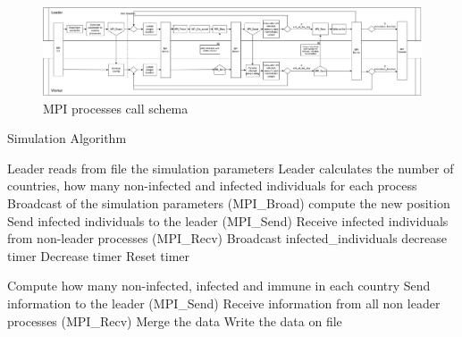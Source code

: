 \documentclass[11pt]{article}
\begin{document}
\begin{figure}[h]
    \centering
    \label{fig:flow}
    \includegraphics[width=1\textwidth]{resources/MPI_flow.png}
    \caption{MPI processes call schema}
\end{figure}
\begin{algorithm}[H]
\caption{Simulation Algorithm}\label{alg:cap}
    \begin{algorithmic}
            \State Leader reads from file the simulation parameters
            \State Leader calculates the number of countries, how many non-infected and infected  individuals for each process 
        \EndIf
        \State Broadcast of the simulation parameters (MPI\_Broad)
            \State compute the new position
                \State Send infected individuals to the leader (MPI\_Send)
                \State Receive infected individuals from non-leader processes (MPI\_Recv)
            \EndIf
                \State Broadcast infected\_individuals
            \EndIf
                    \State decrease timer
                            \State Decrease timer
                        \ElsIf{}
                            \State Reset timer
                        \EndIf
                    \EndFor
                \EndIf
			\EndFor

                \State Compute how many non-infected, infected and immune in each country
                    \State Send information to the leader (MPI\_Send)
                    \State Receive information from all non leader processes (MPI\_Recv)
                    \State Merge the data
                    \State Write the data on file
                \EndIf
            \EndIf
        \EndWhile
        
    \end{algorithmic}
\end{algorithm}
\end{document}
